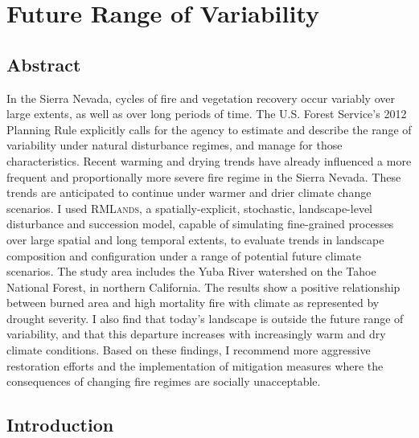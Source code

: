 
\chapter{Future Range of Variability}
\label{ch:FRV}

\section{Abstract}
In the Sierra Nevada, cycles of fire and vegetation recovery occur variably over large extents, as well as over long periods of time. The U.S. Forest Service's 2012 Planning Rule explicitly calls for the agency to estimate and describe the range of variability under natural disturbance regimes, and manage for those characteristics. Recent warming and drying trends have already influenced a more frequent and proportionally more severe fire regime in the Sierra Nevada. These trends are anticipated to continue under warmer and drier climate change scenarios. I used \textsc{RMLands}, a spatially-explicit, stochastic, landscape-level disturbance and succession model, capable of simulating fine-grained processes over large spatial and long temporal extents, to evaluate trends in landscape composition and configuration under a range of potential future climate scenarios. The study area includes the Yuba River watershed on the Tahoe National Forest, in northern California. The results show a positive relationship between burned area and high mortality fire with climate as represented by drought severity. I also find that today's landscape is outside the future range of variability, and that this departure increases with increasingly warm and dry climate conditions. Based on these findings, I recommend more aggressive restoration efforts and the implementation of mitigation measures where the consequences of changing fire regimes are socially unacceptable.



\section{Introduction}

